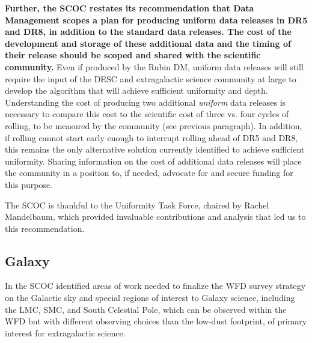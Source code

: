{\bf Further, the SCOC restates its recommendation that Data Management scopes a plan for producing uniform data releases in DR5 and DR8, in addition to the standard data releases. The cost of the development and storage of these additional data and the timing of their release should be scoped and shared with the scientific community.} Even if produced by the Rubin DM, uniform data releases will still require the input of the DESC and extragalactic science community at large to develop the algorithm that will achieve sufficient uniformity and depth. Understanding the cost of producing two additional {\it uniform} data releases is necessary to compare this cost to the scientific cost of three vs. four cycles of rolling, to be measured by the community (see previous paragraph). In addition, if rolling cannot start early enough to interrupt rolling ahead of DR5 and DR8, this remains the only alternative solution currently identified to achieve sufficient uniformity. Sharing information on the cost of additional data releases will place the community in a position to, if needed, advocate for and secure funding for this purpose.

The SCOC is thankful to the Uniformity Task Force, chaired by Rachel Mandelbaum, which provided invaluable contributions and analysis that led us to this recommendation.





\FloatBarrier


\subsection{Galaxy}\label{sec:galaxy}
In  the SCOC identified areas of work needed to finalize the WFD survey strategy on the Galactic sky and special regions of interest to Galaxy science, including the LMC, SMC, and South Celestial Pole, which can be observed within the WFD but with different observing choices than the low-dust footprint, of primary interest for extragalactic science. 

